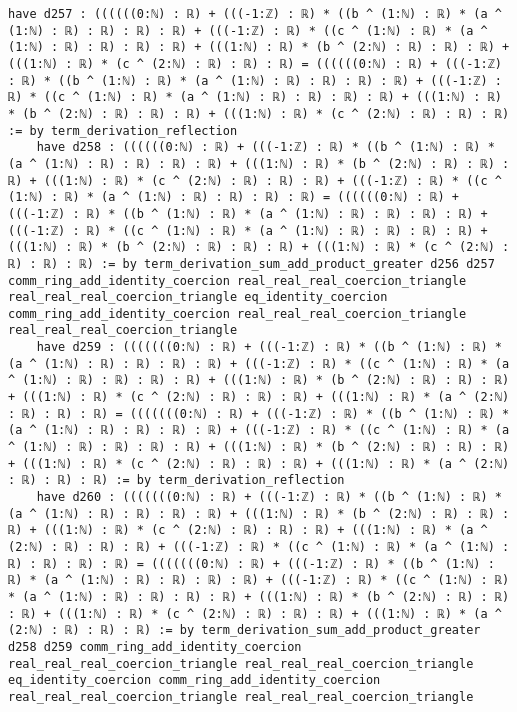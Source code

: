 \documentclass{article}
\begin{document}
\begin{tcolorbox}[colback=white!10, width=\linewidth]
\begin{lstlisting}[language=Lean4]
    have d257 : ((((((0:ℕ) : ℝ) + (((-1:ℤ) : ℝ) * ((b ^ (1:ℕ) : ℝ) * (a ^ (1:ℕ) : ℝ) : ℝ) : ℝ) : ℝ) + (((-1:ℤ) : ℝ) * ((c ^ (1:ℕ) : ℝ) * (a ^ (1:ℕ) : ℝ) : ℝ) : ℝ) : ℝ) + (((1:ℕ) : ℝ) * (b ^ (2:ℕ) : ℝ) : ℝ) : ℝ) + (((1:ℕ) : ℝ) * (c ^ (2:ℕ) : ℝ) : ℝ) : ℝ) = ((((((0:ℕ) : ℝ) + (((-1:ℤ) : ℝ) * ((b ^ (1:ℕ) : ℝ) * (a ^ (1:ℕ) : ℝ) : ℝ) : ℝ) : ℝ) + (((-1:ℤ) : ℝ) * ((c ^ (1:ℕ) : ℝ) * (a ^ (1:ℕ) : ℝ) : ℝ) : ℝ) : ℝ) + (((1:ℕ) : ℝ) * (b ^ (2:ℕ) : ℝ) : ℝ) : ℝ) + (((1:ℕ) : ℝ) * (c ^ (2:ℕ) : ℝ) : ℝ) : ℝ) := by term_derivation_reflection
    have d258 : ((((((0:ℕ) : ℝ) + (((-1:ℤ) : ℝ) * ((b ^ (1:ℕ) : ℝ) * (a ^ (1:ℕ) : ℝ) : ℝ) : ℝ) : ℝ) + (((1:ℕ) : ℝ) * (b ^ (2:ℕ) : ℝ) : ℝ) : ℝ) + (((1:ℕ) : ℝ) * (c ^ (2:ℕ) : ℝ) : ℝ) : ℝ) + (((-1:ℤ) : ℝ) * ((c ^ (1:ℕ) : ℝ) * (a ^ (1:ℕ) : ℝ) : ℝ) : ℝ) : ℝ) = ((((((0:ℕ) : ℝ) + (((-1:ℤ) : ℝ) * ((b ^ (1:ℕ) : ℝ) * (a ^ (1:ℕ) : ℝ) : ℝ) : ℝ) : ℝ) + (((-1:ℤ) : ℝ) * ((c ^ (1:ℕ) : ℝ) * (a ^ (1:ℕ) : ℝ) : ℝ) : ℝ) : ℝ) + (((1:ℕ) : ℝ) * (b ^ (2:ℕ) : ℝ) : ℝ) : ℝ) + (((1:ℕ) : ℝ) * (c ^ (2:ℕ) : ℝ) : ℝ) : ℝ) := by term_derivation_sum_add_product_greater d256 d257 comm_ring_add_identity_coercion real_real_real_coercion_triangle real_real_real_coercion_triangle eq_identity_coercion comm_ring_add_identity_coercion real_real_real_coercion_triangle real_real_real_coercion_triangle
    have d259 : (((((((0:ℕ) : ℝ) + (((-1:ℤ) : ℝ) * ((b ^ (1:ℕ) : ℝ) * (a ^ (1:ℕ) : ℝ) : ℝ) : ℝ) : ℝ) + (((-1:ℤ) : ℝ) * ((c ^ (1:ℕ) : ℝ) * (a ^ (1:ℕ) : ℝ) : ℝ) : ℝ) : ℝ) + (((1:ℕ) : ℝ) * (b ^ (2:ℕ) : ℝ) : ℝ) : ℝ) + (((1:ℕ) : ℝ) * (c ^ (2:ℕ) : ℝ) : ℝ) : ℝ) + (((1:ℕ) : ℝ) * (a ^ (2:ℕ) : ℝ) : ℝ) : ℝ) = (((((((0:ℕ) : ℝ) + (((-1:ℤ) : ℝ) * ((b ^ (1:ℕ) : ℝ) * (a ^ (1:ℕ) : ℝ) : ℝ) : ℝ) : ℝ) + (((-1:ℤ) : ℝ) * ((c ^ (1:ℕ) : ℝ) * (a ^ (1:ℕ) : ℝ) : ℝ) : ℝ) : ℝ) + (((1:ℕ) : ℝ) * (b ^ (2:ℕ) : ℝ) : ℝ) : ℝ) + (((1:ℕ) : ℝ) * (c ^ (2:ℕ) : ℝ) : ℝ) : ℝ) + (((1:ℕ) : ℝ) * (a ^ (2:ℕ) : ℝ) : ℝ) : ℝ) := by term_derivation_reflection
    have d260 : (((((((0:ℕ) : ℝ) + (((-1:ℤ) : ℝ) * ((b ^ (1:ℕ) : ℝ) * (a ^ (1:ℕ) : ℝ) : ℝ) : ℝ) : ℝ) + (((1:ℕ) : ℝ) * (b ^ (2:ℕ) : ℝ) : ℝ) : ℝ) + (((1:ℕ) : ℝ) * (c ^ (2:ℕ) : ℝ) : ℝ) : ℝ) + (((1:ℕ) : ℝ) * (a ^ (2:ℕ) : ℝ) : ℝ) : ℝ) + (((-1:ℤ) : ℝ) * ((c ^ (1:ℕ) : ℝ) * (a ^ (1:ℕ) : ℝ) : ℝ) : ℝ) : ℝ) = (((((((0:ℕ) : ℝ) + (((-1:ℤ) : ℝ) * ((b ^ (1:ℕ) : ℝ) * (a ^ (1:ℕ) : ℝ) : ℝ) : ℝ) : ℝ) + (((-1:ℤ) : ℝ) * ((c ^ (1:ℕ) : ℝ) * (a ^ (1:ℕ) : ℝ) : ℝ) : ℝ) : ℝ) + (((1:ℕ) : ℝ) * (b ^ (2:ℕ) : ℝ) : ℝ) : ℝ) + (((1:ℕ) : ℝ) * (c ^ (2:ℕ) : ℝ) : ℝ) : ℝ) + (((1:ℕ) : ℝ) * (a ^ (2:ℕ) : ℝ) : ℝ) : ℝ) := by term_derivation_sum_add_product_greater d258 d259 comm_ring_add_identity_coercion real_real_real_coercion_triangle real_real_real_coercion_triangle eq_identity_coercion comm_ring_add_identity_coercion real_real_real_coercion_triangle real_real_real_coercion_triangle

\end{lstlisting}
\end{tcolorbox}
\end{document}
